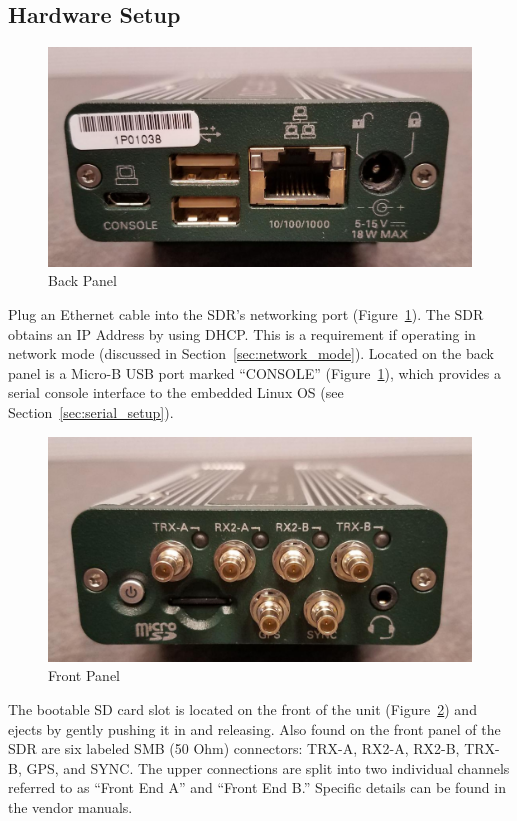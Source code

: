 \begin{flushleft}
\subsection{Hardware Setup}
\begin{figure}[h]
 \centering
 \includegraphics[scale=0.5]{img/back_panel.jpg}
 \caption{Back Panel}
 \label{fig:back}
\end{figure}

Plug an Ethernet cable into the SDR's networking port (Figure~\ref{fig:back}). The SDR obtains an IP Address by using DHCP. This is a requirement if operating in network mode (discussed in Section~\ref{sec:network_mode}). Located on the back panel is a Micro-B USB port marked ``CONSOLE'' (Figure~\ref{fig:back}), which provides a serial console interface to the embedded Linux OS (see Section~\ref{sec:serial_setup}).\\ \bigskip

\begin{figure}[h]
 \centering
 \includegraphics[scale=0.5]{img/front_panel.jpg}
 \caption{Front Panel}
 \label{fig:front}
\end{figure}

The bootable SD card slot is located on the front of the unit (Figure~\ref{fig:front}) and ejects by gently pushing it in and releasing. Also found on the front panel of the SDR are six labeled SMB (50 Ohm) connectors: TRX-A, RX2-A, RX2-B, TRX-B, GPS, and SYNC. The upper connections are split into two individual channels referred to as ``Front End A'' and ``Front End B.'' Specific details can be found in the vendor manuals. \\   \bigskip

\end{flushleft}
